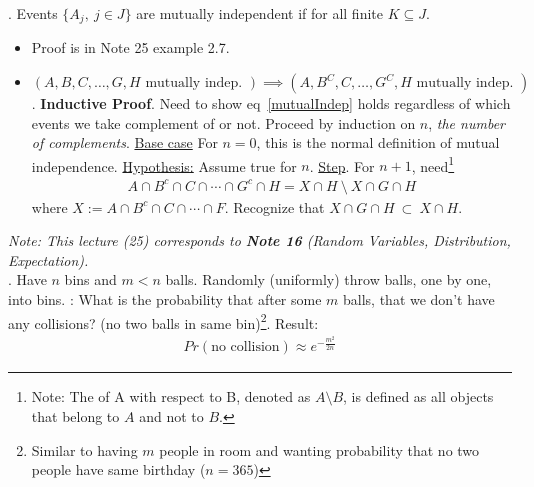 \documentclass[12pt]{article}
\newcommand{\myspace}{\vspace{2\bigskipamount}}
\newcommand\p{\Needspace{12\baselineskip} \noindent}
\begin{document}
\myspace
\p {}. Events $\{A_j, ~ j \in J\}$ are mutually independent if 
	for all finite $K \subseteq J$. \\
\begin{itemize}
	\item {} Proof is in Note 25 example 2.7. 
	
	\item {} $(A, B, C, \ldots, G, H \text{ mutually indep. }) \implies (A, B^C, C, \ldots, G^C, H \text{ mutually indep. })$. \textbf{Inductive Proof}. Need to show eq~\ref{mutualIndep} holds regardless of which events we take complement of or not. Proceed by induction on $n$, \textit{the number of complements}. \underline{Base case} For $n = 0$, this is the normal definition of mutual independence. \underline{Hypothesis:} Assume true for $n$. \underline{Step}. For $n + 1$, need\footnote{Note: The  of A with respect to B, denoted as $A \setminus B$, is defined as all objects that belong to $A$ and not to $B$.}
	\begin{align}
		A \cap B^c \cap C \cap \cdots \cap G^c \cap H = X \cap H ~ \setminus ~ X \cap G \cap H
	\end{align}
	where $X := A \cap B^c \cap C \cap \cdots \cap F$. Recognize that $ X \cap G \cap H ~ \subset ~  X \cap H$. 
\end{itemize}





\p \textit{Note: This lecture (25) corresponds to \textbf{Note 16} (Random Variables, Distribution, Expectation).} \\

\p {}. Have $n$ bins and $m < n$ balls. Randomly (uniformly) throw balls, one by one, into bins. : What is the probability that after some $m$ balls, that we don't have any collisions? (no two balls in same bin)\footnote{Similar to having $m$ people in room and wanting probability that no two people have same birthday ($n = 365$)}. Result:
\begin{align}
	Pr(\text{no collision}) \approx e^{- \frac{m^2}{2n} }
\end{align}
\end{document}
